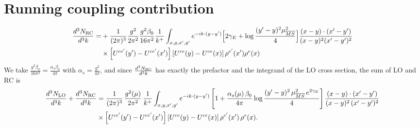 \documentclass[9pt]{article}
\numberwithin{equation}{section}
\begin{document}
\section{Running coupling contribution}
\begin{align}
\frac{d^{3}N_{\rm RC}}{d^{3}k}= & +\frac{1}{(2\pi)^{3}}\frac{g^{2}}{2\pi^{2}}\frac{g^{2}\beta_{0}}{16\pi^{2}}\frac{1}{k^{+}}\int_{x,y,x',y'}e^{-ik\cdot(y-y')}\Big[2\gamma_{E}+\log\frac{(y'-y)^{2}\mu^{2}_{\overline{MS}}}{4}\Big]\frac{(x-y)\cdot(x'-y')}{(x-y)^{2}(x'-y')^{2}}\notag\\
&\times\left[U^{ce'}(y') - U^{ce'}(x')\right]\left[U^{ce}(y) - U^{ce}(x)\right]\rho^{e'}(x')\rho^{e}(x)
\end{align}
We take $\frac{g^{2}\beta_{0}}{16\pi^{2}}=\frac{\alpha_{s}\beta_{0}}{4\pi}$ with $\alpha_{s}=\frac{g^{2}}{4\pi}$, and since $\frac{d^{3}N_{\rm RC}}{d^{3}k}$ has exactly the prefactor and the integrand of the LO cross section, the sum of LO and RC is
\begin{align}
\frac{d^{3}N_{\rm LO}}{d^{3}k}+\frac{d^{3}N_{\rm RC}}{d^{3}k}&=\frac{1}{(2\pi)^{3}}\,\frac{g^{2}(\mu)}{2\pi^{2}}\,\frac{1}{k^{+}}\int_{x,y,x',y'}e^{-ik\cdot(y-y')}\left[1+\frac{\alpha_{s}(\mu)\,\beta_{0}}{4\pi}\log\frac{(y'-y)^{2}\,\mu^{2}_{\overline{MS}}\,e^{2\gamma_{E}}}{4}\right]\frac{(x-y)\cdot(x'-y')}{(x-y)^{2}\,(x'-y')^{2}}\notag\\
&\times\left[U^{ce'}(y')-U^{ce'}(x')\right]\left[U^{ce}(y)-U^{ce}(x)\right]\rho^{e'}(x')\,\rho^{e}(x).
\end{align}
\end{document}
